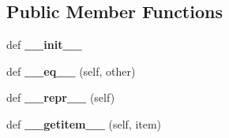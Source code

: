 \subsection*{Public Member Functions}
\begin{DoxyCompactItemize}
\item 
\hypertarget{classminix__inode_1_1minix__inode_ac775ee34451fdfa742b318538164070e}{}def {\bfseries \+\_\+\+\_\+init\+\_\+\+\_\+}\label{classminix__inode_1_1minix__inode_ac775ee34451fdfa742b318538164070e}

\item 
\hypertarget{classminix__inode_1_1minix__inode_ad794ff077f2f05f228a7109f3670ac40}{}def {\bfseries \+\_\+\+\_\+eq\+\_\+\+\_\+} (self, other)\label{classminix__inode_1_1minix__inode_ad794ff077f2f05f228a7109f3670ac40}

\item 
\hypertarget{classminix__inode_1_1minix__inode_a9a47563093dfc5ba12274b66e368920c}{}def {\bfseries \+\_\+\+\_\+repr\+\_\+\+\_\+} (self)\label{classminix__inode_1_1minix__inode_a9a47563093dfc5ba12274b66e368920c}

\item 
\hypertarget{classminix__inode_1_1minix__inode_aab91ae2e037c39b631a69273c277bfe9}{}def {\bfseries \+\_\+\+\_\+getitem\+\_\+\+\_\+} (self, item)\label{classminix__inode_1_1minix__inode_aab91ae2e037c39b631a69273c277bfe9}

\end{DoxyCompactItemize}
